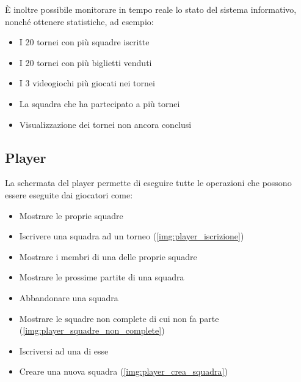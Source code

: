 \documentclass[a4paper,12pt]{report}
\begin{document}
È inoltre possibile monitorare in tempo reale lo stato del sistema informativo, nonché ottenere statistiche, ad esempio: 
\begin{itemize}
	\item I 20 tornei con più squadre iscritte
	\item I 20 tornei con più biglietti venduti
	\item I 3 videogiochi più giocati nei tornei
	\item La squadra che ha partecipato a più tornei
	\item Visualizzazione dei tornei non ancora conclusi
\end{itemize}
\subsection{Player}
La schermata del player permette di eseguire tutte le operazioni che possono essere eseguite dai giocatori come:
\begin{itemize}
	\item Mostrare le proprie squadre
	\item Iscrivere una squadra ad un torneo (\cref{img:player_iscrizione})
	\item Mostrare i membri di una delle proprie squadre
	\item Mostrare le prossime partite di una squadra
	\item Abbandonare una squadra
	\item Mostrare le squadre non complete di cui non fa parte (\cref{img:player_squadre_non_complete})
	\item Iscriversi ad una di esse 
	\item Creare una nuova squadra (\cref{img:player_crea_squadra})
\end{itemize}  
\end{document}
